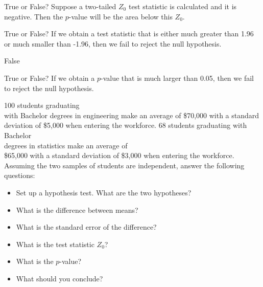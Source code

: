 \documentclass[11pt]{book}\usepackage[]{graphicx}\usepackage[]{color}
\begin{document}
\begin{exercises}
\begin{exercise}
True or False? Suppose a two-tailed $Z_0$ test statistic is calculated and it is negative. Then the $p$-value will be the area below this $Z_0$.

\end{exercise}
% 
% 

\begin{exercise} %

True or False? If we obtain a test statistic that is either much greater than 1.96 or much smaller than -1.96, then we fail to reject the null hypothesis.

\end{exercise}
\begin{solution} %

False 

\end{solution}


\begin{exercise} %

True or False? If we obtain a $p$-value that is much larger than 0.05, then we fail to reject the null hypothesis.

\end{exercise}
% 
% 

\begin{exercise}  %



100 students graduating \\ with Bachelor degrees in engineering make an average of \$70,000 with a standard deviation of \$5,000 when entering the workforce. 68 students graduating with Bachelor \\ degrees in statistics make an average of \\  \$65,000 with a standard deviation of \$3,000 when entering the workforce. Assuming the two samples of students are independent, answer the following questions:

\begin{itemize}
  \item Set up a hypothesis test. What are the two hypotheses?
  \item What is the difference between means?
  \item What is the standard error of the difference?
  \item What is the test statistic $Z_0$?
  \item What is the $p$-value?
  \item What should you conclude?
\end{itemize}


\end{exercise}
\end{exercises}
\end{document}
